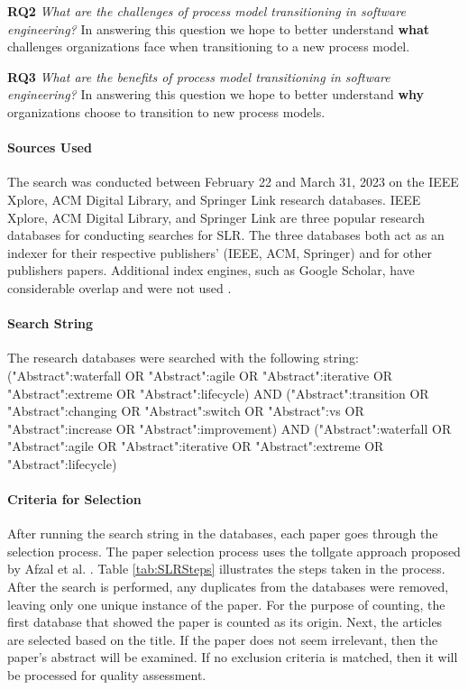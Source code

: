 \documentclass[conference]{IEEEtran}
\begin{document}
\textbf{RQ2} \textit{What are the challenges of process model transitioning in software engineering?} In answering this question we hope to better understand \textbf{what} challenges organizations face when transitioning to a new process model.

\textbf{RQ3} \textit{What are the benefits of process model transitioning in software engineering?} In answering this question we hope to better understand \textbf{why} organizations choose to transition to new process models.

\paragraph{Sources Used}
The search was conducted between February 22 and March 31, 2023 on the IEEE Xplore, ACM Digital Library, and Springer Link research databases. IEEE Xplore, ACM Digital Library, and Springer Link are three popular research databases for conducting searches for SLR. The three databases both act as an indexer for their respective publishers' (IEEE, ACM, Springer) and for other publishers papers. Additional index engines, such as Google Scholar, have considerable overlap and were not used \cite{chen2010}.

\paragraph{Search String}
The research databases were searched with the following string: ("Abstract":waterfall OR "Abstract":agile OR "Abstract":iterative OR "Abstract":extreme OR "Abstract":lifecycle) AND ("Abstract":transition OR "Abstract":changing OR "Abstract":switch OR "Abstract":vs OR "Abstract":increase OR "Abstract":improvement) AND ("Abstract":waterfall OR "Abstract":agile OR "Abstract":iterative OR "Abstract":extreme OR "Abstract":lifecycle)

\paragraph{Criteria for Selection}
After running the search string in the databases, each paper goes through the selection process. The paper selection process uses the tollgate approach proposed by Afzal et al. \cite{AFZAL2009957}. Table \ref{tab:SLRSteps} illustrates the steps taken in the process. After the search is performed, any duplicates from the databases were removed, leaving only one unique instance of the paper. For the purpose of counting, the first database that showed the paper is counted as its origin. Next, the articles are selected based on the title. If the paper  does not seem irrelevant, then the paper's abstract will be examined. If no exclusion criteria is matched, then it will be processed for quality assessment.
\end{document}
